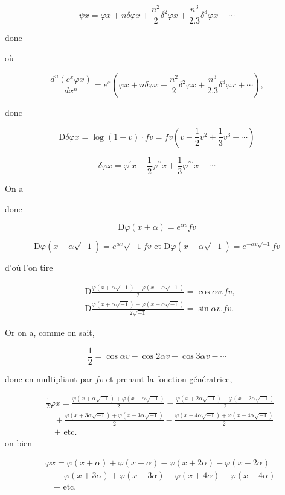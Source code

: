 \documentclass{article}
\begin{document}
\[
\psi x=\varphi x+n \delta \varphi x+\frac{n^{2}}{2} \delta^{2} \varphi x+\frac{n^{3}}{2.3} \delta^{3} \varphi x+\cdots
\]

done

où

\[
\frac{d^{n}\left(e^{x} \varphi x\right)}{d x^{n}}=e^{x}\left(\varphi x+n \delta \varphi x+\frac{n^{2}}{2} \delta^{2} \varphi x+\frac{n^{3}}{2.3} \delta^{3} \varphi x+\cdots\right),
\]

donc

\[
\mathrm{D} \delta \varphi x=\log (1+v) \cdot f v=f v\left(v-\frac{1}{2} v^{2}+\frac{1}{3} v^{3}-\cdots\right)
\]

\[
\delta \varphi x=\varphi^{\prime} x-\frac{1}{2} \varphi^{\prime \prime} x+\frac{1}{3} \varphi^{\prime \prime \prime} x-\cdots
\]

On a

done

\[
\mathrm{D} \varphi(x+\alpha)=e^{\alpha v} f v
\]

\[
\mathrm{D} \varphi(x+\alpha \sqrt{-1})=e^{\alpha v} \sqrt{-1} f v \text { et } \mathrm{D} \varphi(x-\alpha \sqrt{-1})=e^{-\alpha v \sqrt{-1}} f v
\]

d'où l'on tire

\[
\begin{aligned}
& \mathrm{D} \frac{\varphi(x+\alpha \sqrt{-1})+\varphi(x-\alpha \sqrt{-1})}{2}=\cos \alpha v . f v, \\
& \mathrm{D} \frac{\varphi(x+\alpha \sqrt{-1})-\varphi(x-\alpha \sqrt{-1})}{2 \sqrt{-1}}=\sin \alpha v . f v .
\end{aligned}
\]

Or on a, comme on sait,

\[
\frac{1}{2}=\cos \alpha v-\cos 2 \alpha v+\cos 3 \alpha v-\cdots
\]

donc en multipliant par \(f v\) et prenant la fonction génératrice,

\[
\begin{aligned}
& \frac{1}{2} \varphi x=\frac{\varphi(x+\alpha \sqrt{-1})+\varphi(x-\alpha \sqrt{-1})}{2}-\frac{\varphi(x+2 \alpha \sqrt{-1})+\varphi(x-2 \alpha \sqrt{-1})}{2} \\
& \quad+\frac{\varphi(x+3 \alpha \sqrt{-1})+\varphi(x-3 \alpha \sqrt{-1})}{2}-\frac{\varphi(x+4 \alpha \sqrt{-1})+\varphi(x-4 \alpha \sqrt{-1})}{2} \\
& \quad+\text { etc. }
\end{aligned}
\]
on bien

\[
\begin{aligned}
& \varphi x=\varphi(x+\alpha)+\varphi(x-\alpha)-\varphi(x+2 \alpha)-\varphi(x-2 \alpha) \\
& \quad+\varphi(x+3 \alpha)+\varphi(x-3 \alpha)-\varphi(x+4 \alpha)-\varphi(x-4 \alpha) \\
& \quad+\text { etc. }
\end{aligned}
\]
\end{document}
